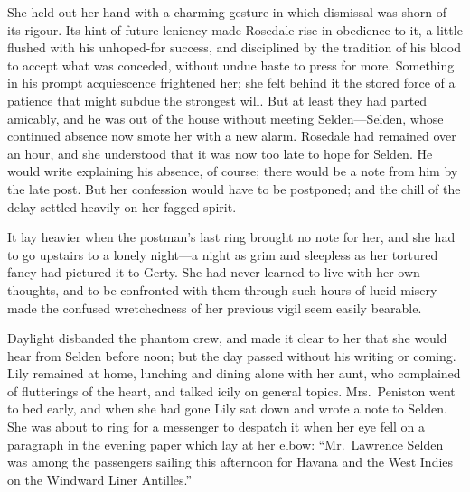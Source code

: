 \documentclass[12pt,a4paper]{book}
\begin{document}
She held out her hand with a charming gesture in which
dismissal was shorn of its rigour. Its hint of future leniency
made Rosedale rise in obedience to it, a little flushed with his
unhoped-for success, and disciplined by the tradition of his
blood to accept what was conceded, without undue haste to
press for more. Something in his prompt acquiescence frightened
her; she felt behind it the stored force of a patience that
might subdue the strongest will. But at least they had parted
amicably, and he was out of the house without meeting
Selden---Selden, whose continued absence now smote her with
a new alarm. Rosedale had remained over an hour, and she
understood that it was now too late to hope for Selden. He
would write explaining his absence, of course; there would be
a note from him by the late post. But her confession would
have to be postponed; and the chill of the delay settled heavily
on her fagged spirit.





It lay heavier when the postman's last ring brought no note
for her, and she had to go upstairs to a lonely night---a night
as grim and sleepless as her tortured fancy had pictured it to
Gerty. She had never learned to live with her own thoughts,
and to be confronted with them through such hours of lucid
misery made the confused wretchedness of her previous vigil
seem easily bearable.





Daylight disbanded the phantom crew, and made it clear
to her that she would hear from Selden before noon; but the
day passed without his writing or coming. Lily remained at
home, lunching and dining alone with her aunt, who complained of
flutterings of the heart, and talked icily on general
topics. Mrs.\ Peniston went to bed early, and when she had
gone Lily sat down and wrote a note to Selden. She was
about to ring for a messenger to despatch it when her eye fell
on a paragraph in the evening paper which lay at her elbow: 
``Mr.\ Lawrence Selden was among the passengers sailing this
afternoon for Havana and the West Indies on the Windward
Liner Antilles.''
\end{document}
